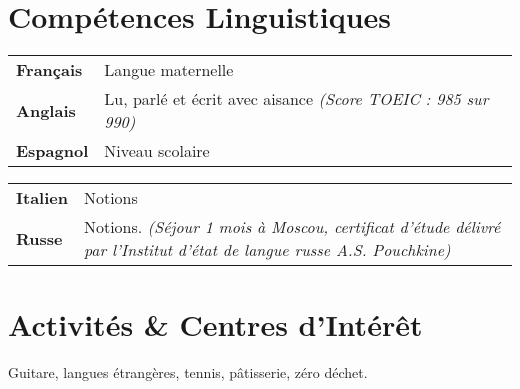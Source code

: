 \documentclass[10pt, a4paper]{article}
\begin{document}
\section{Compétences Linguistiques}
\begin{minipage}[t]{0.5\textwidth}
	\begin{tabu} to 
		\textbf{Français} & Langue maternelle\\
		\textbf{Anglais} & Lu, parlé et écrit avec aisance \em (Score TOEIC : 985 sur 990)\\
		\textbf{Espagnol} & Niveau scolaire\\
	\end{tabu}
\end{minipage}
\begin{minipage}[t]{0.5\textwidth}
	\begin{tabu} to 
		\textbf{Italien} & Notions\\
		\textbf{Russe} & Notions. \em (Séjour 1 mois à Moscou, certificat d'étude délivré par l'Institut d'état de langue russe A.S. Pouchkine)\\
	\end{tabu}	
\end{minipage}
\vspace{-0.3cm}
\section{Activités \& Centres d'Intérêt}
Guitare, langues étrangères, tennis, pâtisserie, zéro déchet.
\end{document}
